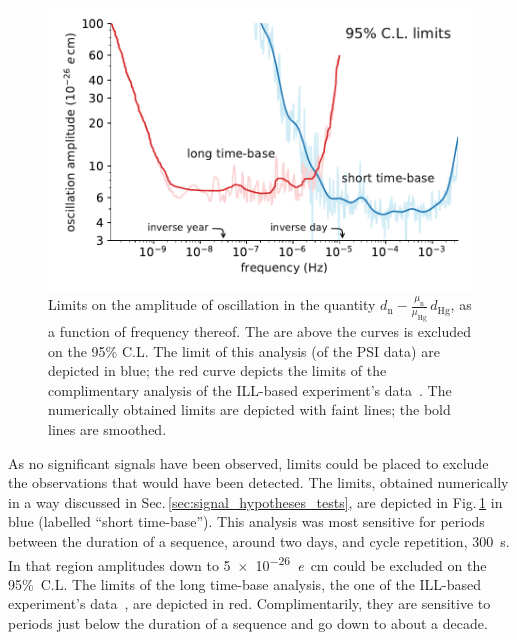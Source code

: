 
\begin{figure}
  \centering
  \includegraphics[width=\linewidth]{gfx/axions/psi_ill_1e-26ecm.pdf}
  \caption{Limits on the amplitude of oscillation in the quantity $d_\text{n} - \frac{\mu_\text{n}}{\mu_\text{Hg}} \, d_\text{Hg}$, as a function of frequency thereof. The are above the curves is excluded on the 95\% C.L. The limit of this analysis (of the PSI data) are depicted in blue; the red curve depicts the limits of the complimentary analysis of the ILL-based experiment's data~\cite{AyresThesis,PhysRevX.7.041034}. The numerically obtained limits are depicted with faint lines; the bold lines are smoothed.}
\label{fig:axions_limits_nEDM}
\end{figure}

As no significant signals have been observed, limits could be placed to exclude the observations that would have been detected. The limits, obtained numerically in a way discussed in Sec.\,\ref{sec:signal_hypotheses_tests}, are depicted in Fig.\,\ref{fig:axions_limits_nEDM} in blue (labelled ``short time-base''). This analysis was most sensitive for periods between the duration of a sequence, around two days, and cycle repetition, \SI{300}{\second}. In that region amplitudes down to \SI{5e-26}{\elementarycharge\centi\meter} could be excluded on the 95\%~C.L. The limits of the long time-base analysis, the one of the ILL-based experiment's data~\cite{AyresThesis,PhysRevX.7.041034}, are depicted in red. Complimentarily, they are sensitive to periods just below the duration of a sequence and go down to about a decade.

